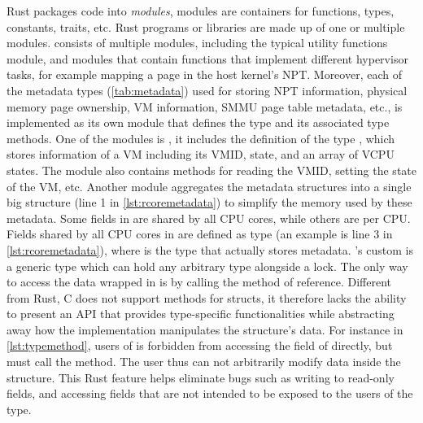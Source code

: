 Rust packages code into \textit{modules}, modules are containers for functions,
types, constants, traits, etc. Rust programs or libraries are made up of one or
multiple modules.
\rustcore{} consists of multiple modules, including the typical utility
functions module, and modules that contain functions that implement different
hypervisor tasks, for example mapping a page in the host kernel's NPT.
Moreover, each of the \rustcore{} metadata types (\autoref{tab:metadata}) used
for storing NPT information, physical memory page ownership, VM information,
SMMU page table metadata, etc., is implemented as its own module that defines
the type and its associated type methods.
One of the modules is , it includes the definition of the type
, which stores information of a VM including its VMID, state, and
an array of VCPU states. The module also contains methods for reading the VMID,
setting the state of the VM, etc.
Another module aggregates the \rustcore{} metadata structures into a single big
structure  (line 1 in \autoref{lst:rcoremetadata}) to simplify
the memory used by these metadata.
Some fields in  are shared by all CPU cores, while others are per CPU.
Fields shared by all CPU cores in  are defined as type 
(an example is line 3 in \autoref{lst:rcoremetadata}),
where  is the type that actually stores \rustcore{} metadata.
\rustcore{}'s custom \code{\lock{}} is a generic type which can hold any
arbitrary type alongside a lock.
The only way to access the data wrapped in \code{\lock{}} is by calling the
 method of \code{\lock{}} reference.
Different from Rust, C does not support methods for structs, it therefore lacks
the ability to present an API that provides type-specific functionalities while
abstracting away how the implementation manipulates the structure's data.
For instance in \autoref{lst:typemethod}, users of  is forbidden
from accessing the  field of  directly, but must call
the  method. The user thus can not arbitrarily modify data
inside the structure. This Rust feature helps eliminate bugs such as writing to
read-only fields, and accessing fields that are not intended to be exposed to
the users of the type.

